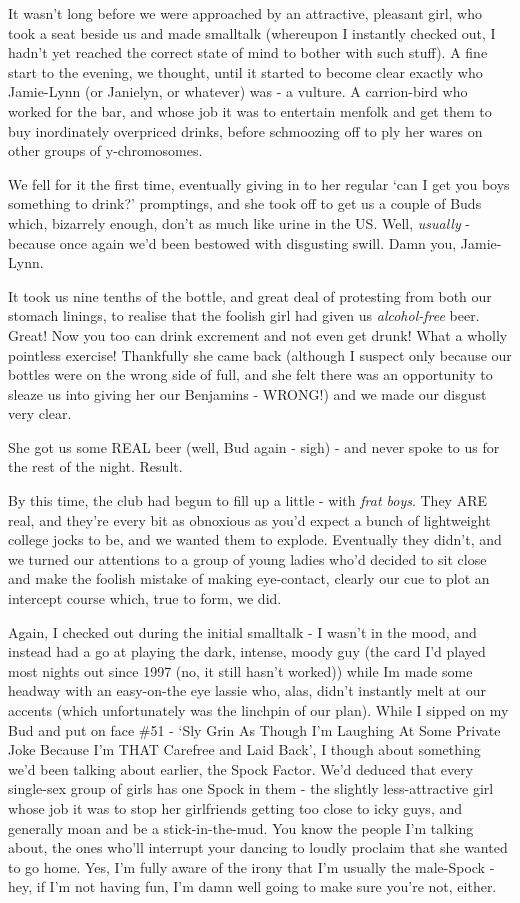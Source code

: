 \documentclass[a5paper,titlepage,draft]{book}
\begin{document}
It wasn't long before we were approached by an attractive, pleasant girl, who took a seat beside us and made smalltalk (whereupon I instantly checked out, I hadn't yet reached the correct state of mind to bother with such stuff).  A fine start to the evening, we thought, until it started to become clear exactly who Jamie-Lynn (or Janielyn, or whatever) was - a vulture.  A carrion-bird who worked for the bar, and whose job it was to entertain menfolk and get them to buy inordinately overpriced drinks, before schmoozing off to ply her wares on other groups of y-chromosomes.

We fell for it the first time, eventually giving in to her regular `can I get you boys something to drink?' promptings, and she took off to get us a couple of Buds which, bizarrely enough, don't as much like urine in the US.  Well, \emph{usually} - because once again we'd been bestowed with disgusting swill.  Damn you, Jamie-Lynn.

It took us nine tenths of the bottle, and great deal of protesting from both our stomach linings, to realise that the foolish girl had given us \emph{alcohol-free} beer.  Great!  Now you too can drink excrement and not even get drunk!  What a wholly pointless exercise!  Thankfully she came back (although I suspect only because our bottles were on the wrong side of full, and she felt there was an opportunity to sleaze us into giving her our Benjamins - WRONG!) and we made our disgust very clear.

She got us some REAL beer (well, Bud again - sigh) - and never spoke to us for the rest of the night.  Result.

By this time, the club had begun to fill up a little - with \emph{frat boys}.  They ARE real, and they're every bit as obnoxious as you'd expect a bunch of lightweight college jocks to be, and we wanted them to explode.  Eventually they didn't, and we turned our attentions to a group of young ladies who'd decided to sit close and make the foolish mistake of making eye-contact, clearly our cue to plot an intercept course which, true to form, we did.

Again, I checked out during the initial smalltalk - I wasn't in the mood, and instead had a go at playing the dark, intense, moody guy (the card I'd played most nights out since 1997 (no, it still hasn't worked)) while Im made some headway with an easy-on-the eye lassie who, alas, didn't instantly melt at our accents (which unfortunately was the linchpin of our plan).  While I sipped on my Bud and put on face \#51 - `Sly Grin As Though I'm Laughing At Some Private Joke Because I'm THAT Carefree and Laid Back', I though about something we'd been talking about earlier, the Spock Factor.  We'd deduced that every single-sex group of girls has one Spock in them - the slightly less-attractive girl whose job it was to stop her girlfriends getting too close to icky guys, and generally moan and be a stick-in-the-mud.  You know the people I'm talking about, the ones who'll interrupt your dancing to loudly proclaim that she wanted to go home.  Yes, I'm fully aware of the irony that I'm usually the male-Spock - hey, if I'm not having fun, I'm damn well going to make sure you're not, either.
\end{document}
